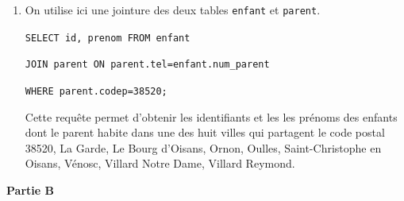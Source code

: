 \documentclass[11pt,a4paper]{article}
\begin{document}
\begin{enumerate}
\item On utilise ici une jointure des deux tables \texttt{enfant} et \texttt{parent}.

\texttt{SELECT id, prenom FROM enfant}

\texttt{JOIN parent ON parent.tel=enfant.num\_parent}

\texttt{WHERE parent.codep=38520;}

Cette requête permet d'obtenir les identifiants et les les prénoms des enfants dont le parent habite dans une des huit villes qui partagent le code postal 38520, La Garde, Le Bourg d'Oisans, Ornon, Oulles, Saint-Christophe en Oisans, Vénosc, Villard Notre Dame, Villard Reymond.
\end{enumerate}


\newpage

\textbf{Partie B}
\end{document}
